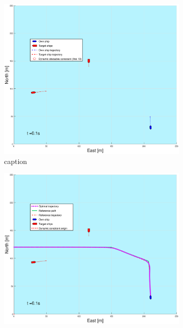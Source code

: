 \begin{figure}[!ht] %
    \begin{subfigure}[b]{0.49\textwidth}
        \centering
        \includegraphics[width=\textwidth]{Images/Figures/Havn1/_Simple_1fig1_time=0}
        \caption{caption}
    \end{subfigure}
    \hfill
    \begin{subfigure}[b]{0.499\textwidth}
        \centering
        \includegraphics[width=\textwidth]{Images/Figures/Havn1/_Simple_1fig999_time=0}

\end{subfigure}
\end{figure}
